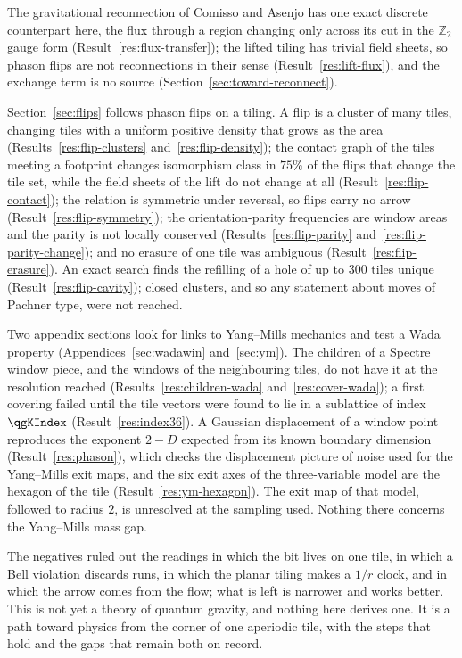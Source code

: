 \documentclass[11pt]{article}
\theoremstyle{definition}
\begin{document}
The gravitational reconnection of Comisso and Asenjo \cite{comisso2026} has one exact discrete counterpart here, the flux through a region changing only across its cut in the $\mathbb{Z}_2$ gauge form (Result~\ref{res:flux-transfer}); the lifted tiling has trivial field sheets, so phason flips are not reconnections in their sense (Result~\ref{res:lift-flux}), and the exchange term is no source (Section~\ref{sec:toward-reconnect}).

Section~\ref{sec:flips} follows phason flips on a tiling. A flip is a cluster of many tiles, changing tiles with a uniform positive density that grows as the area (Results~\ref{res:flip-clusters} and~\ref{res:flip-density}); the contact graph of the tiles meeting a footprint changes isomorphism class in $75\%$ of the flips that change the tile set, while the field sheets of the lift do not change at all (Result~\ref{res:flip-contact}); the relation is symmetric under reversal, so flips carry no arrow (Result~\ref{res:flip-symmetry}); the orientation-parity frequencies are window areas and the parity is not locally conserved (Results~\ref{res:flip-parity} and~\ref{res:flip-parity-change}); and no erasure of one tile was ambiguous (Result~\ref{res:flip-erasure}). An exact search finds the refilling of a hole of up to $300$ tiles unique (Result~\ref{res:flip-cavity}); closed clusters, and so any statement about moves of Pachner type, were not reached.

Two appendix sections look for links to Yang--Mills mechanics and test a Wada property (Appendices~\ref{sec:wadawin} and~\ref{sec:ym}). The children of a Spectre window piece, and the windows of the neighbouring tiles, do not have it at the resolution reached (Results~\ref{res:children-wada} and~\ref{res:cover-wada}); a first covering failed until the tile vectors were found to lie in a sublattice of index $\qgKIndex$ (Result~\ref{res:index36}). A Gaussian displacement of a window point reproduces the exponent $2-D$ expected from its known boundary dimension (Result~\ref{res:phason}), which checks the displacement picture of noise used for the Yang--Mills exit maps, and the six exit axes of the three-variable model are the hexagon of the tile (Result~\ref{res:ym-hexagon}). The exit map of that model, followed to radius $2$, is unresolved at the sampling used. Nothing there concerns the Yang--Mills mass gap.

The negatives ruled out the readings in which the bit lives on one tile, in which a Bell violation discards runs, in which the planar tiling makes a $1/r$ clock, and in which the arrow comes from the flow; what is left is narrower and works better. This is not yet a theory of quantum gravity, and nothing here derives one. It is a path toward physics from the corner of one aperiodic tile, with the steps that hold and the gaps that remain both on record.
\end{document}
